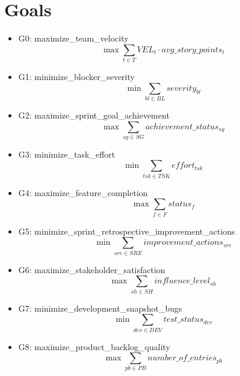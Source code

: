 \documentclass{article}
\begin{document}
\section{Goals}
\begin{itemize}
    \item G0: maximize\_team\_velocity
        \begin{equation*}
            \max \sum_{t \in T} VEL_{t} \cdot avg\_story\_points_{t}
        \end{equation*}
    \item G1: minimize\_blocker\_severity
        \begin{equation*}
            \min \sum_{bl \in BL} severity_{bl}
        \end{equation*}
    \item G2: maximize\_sprint\_goal\_achievement
        \begin{equation*}
            \max \sum_{sg \in SG} achievement\_status_{sg}
        \end{equation*}
    \item G3: minimize\_task\_effort
        \begin{equation*}
            \min \sum_{tsk \in TSK} effort_{tsk}
        \end{equation*}
    \item G4: maximize\_feature\_completion
        \begin{equation*}
            \max \sum_{f \in F} status_{f}
        \end{equation*}
    \item G5: minimize\_sprint\_retrospective\_improvement\_actions
        \begin{equation*}
            \min \sum_{sre \in SRE} improvement\_actions_{sre}
        \end{equation*}
    \item G6: maximize\_stakeholder\_satisfaction
        \begin{equation*}
            \max \sum_{sh \in SH} influence\_level_{sh}
        \end{equation*}
    \item G7: minimize\_development\_snapshot\_bugs
        \begin{equation*}
            \min \sum_{dev \in DEV} test\_status_{dev}
        \end{equation*}
    \item G8: maximize\_product\_backlog\_quality
        \begin{equation*}
            \max \sum_{pb \in PB} number\_of\_entries_{pb}

\end{equation*}
\end{itemize}
\end{document}
